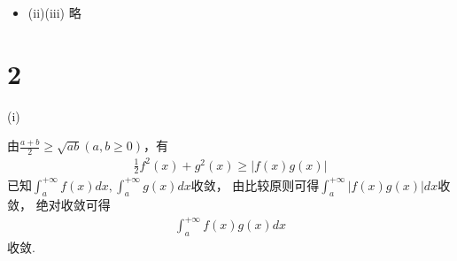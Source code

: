 \documentclass{article}
\begin{document}
\begin{itemize}
\begin{itemize}
                $\lim\limits_{x \to +\infty} \frac{f(x)}{g(x)} = c$，
                由极限定义可知，对$\epsilon = \frac{1}{2} c$，存在$M > 0$，当$x > M$，有
                \begin{align*}
                  \left|\frac{f(x)}{g(x)} - c \right| < \epsilon = \frac{1}{2} c \\
                  \frac{1}{2}c < \frac{f(x)}{g(x)} < \frac{3}{2} c               \\
                  \frac{c}{2} g(x) < f(x) < \frac{3c}{2} g(x)
                \end{align*}
                (1) $\frac{c}{2} g(x) < f(x)$如果$\int_{a}^{+\infty} f(x) dx$收敛，
                由比较原则，$\int_{a}^{+\infty} \frac{c}{2} g(x) dx$收敛，
                又
                \begin{align*}
                  \int_{a}^{+\infty} \frac{c}{2} g(x) dx
                   & = \lim\limits_{u \to +\infty} \int_{a}^{u} \frac{c}{2} g(x) dx \\
                   & = \lim\limits_{u \to +\infty} \frac{c}{2} \int_{a}^{u} g(x) dx \\
                   & = \frac{c}{2} \lim\limits_{u \to +\infty} \int_{a}^{u} g(x) dx
                \end{align*}
                所以$\lim\limits_{u \to +\infty} \int_{a}^{u} g(x) dx $收敛，即
                $\int_{a}^{+\infty} g(x) dx$收敛。

                (2)$f(x) < \frac{3c}{2} g(x)$如果$\int_{a}^{+\infty} f(x) dx$发散，
                由比较原则，$\int_{a}^{+\infty} \frac{3c}{2} g(x) dx$发散，
                从而$\int_{a}^{+\infty} g(x) dx$发散。


                同理可证，由于$f(x) < \frac{3c}{2} g(x)$则$g(x)$收敛，$f(x)$收敛；
                由于$\frac{c}{2} g(x) < f(x)$则$g(x)$发散，$f(x)$发散。

          \item (ii)(iii) 略
        \end{itemize}
\end{itemize}

\section*{2}

 (i)

由$\frac{a + b}{2} \geq \sqrt{ab} (a, b \geq 0)$，有
\begin{align*}
  \frac{1}{2}f^2(x) + g^2(x) \geq |f(x) g(x)|
\end{align*}
已知$\int_{a}^{+\infty} f(x) dx, \int_{a}^{+\infty} g(x) dx$收敛，
由比较原则可得$\int_{a}^{+\infty} |f(x) g(x)| dx$收敛，
绝对收敛可得
\begin{align*}
  \int_{a}^{+\infty} f(x) g(x) dx
\end{align*}
收敛.
\end{document}
